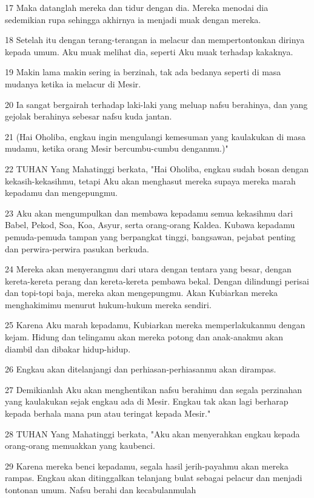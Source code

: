 \par 17 Maka datanglah mereka dan tidur dengan dia. Mereka menodai dia sedemikian rupa sehingga akhirnya ia menjadi muak dengan mereka.
\par 18 Setelah itu dengan terang-terangan ia melacur dan mempertontonkan dirinya kepada umum. Aku muak melihat dia, seperti Aku muak terhadap kakaknya.
\par 19 Makin lama makin sering ia berzinah, tak ada bedanya seperti di masa mudanya ketika ia melacur di Mesir.
\par 20 Ia sangat bergairah terhadap laki-laki yang meluap nafsu berahinya, dan yang gejolak berahinya sebesar nafsu kuda jantan.
\par 21 (Hai Oholiba, engkau ingin mengulangi kemesuman yang kaulakukan di masa mudamu, ketika orang Mesir bercumbu-cumbu denganmu.)"
\par 22 TUHAN Yang Mahatinggi berkata, "Hai Oholiba, engkau sudah bosan dengan kekasih-kekasihmu, tetapi Aku akan menghasut mereka supaya mereka marah kepadamu dan mengepungmu.
\par 23 Aku akan mengumpulkan dan membawa kepadamu semua kekasihmu dari Babel, Pekod, Soa, Koa, Asyur, serta orang-orang Kaldea. Kubawa kepadamu pemuda-pemuda tampan yang berpangkat tinggi, bangsawan, pejabat penting dan perwira-perwira pasukan berkuda.
\par 24 Mereka akan menyerangmu dari utara dengan tentara yang besar, dengan kereta-kereta perang dan kereta-kereta pembawa bekal. Dengan dilindungi perisai dan topi-topi baja, mereka akan mengepungmu. Akan Kubiarkan mereka menghakimimu menurut hukum-hukum mereka sendiri.
\par 25 Karena Aku marah kepadamu, Kubiarkan mereka memperlakukanmu dengan kejam. Hidung dan telingamu akan mereka potong dan anak-anakmu akan diambil dan dibakar hidup-hidup.
\par 26 Engkau akan ditelanjangi dan perhiasan-perhiasanmu akan dirampas.
\par 27 Demikianlah Aku akan menghentikan nafsu berahimu dan segala perzinahan yang kaulakukan sejak engkau ada di Mesir. Engkau tak akan lagi berharap kepada berhala mana pun atau teringat kepada Mesir."
\par 28 TUHAN Yang Mahatinggi berkata, "Aku akan menyerahkan engkau kepada orang-orang memuakkan yang kaubenci.
\par 29 Karena mereka benci kepadamu, segala hasil jerih-payahmu akan mereka rampas. Engkau akan ditinggalkan telanjang bulat sebagai pelacur dan menjadi tontonan umum. Nafsu berahi dan kecabulanmulah
